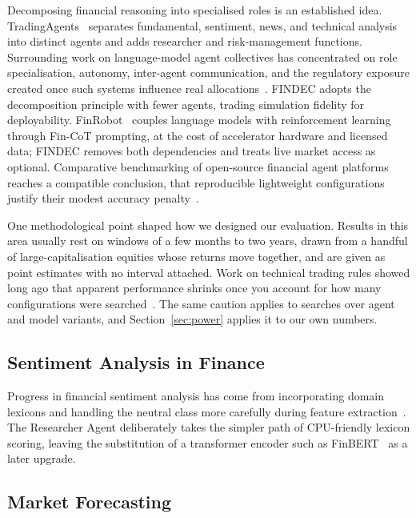 \documentclass[conference]{IEEEtran}
\begin{document}
Decomposing financial reasoning into specialised roles is an established idea. TradingAgents~\cite{xiao2024tradingagents} separates fundamental, sentiment, news, and technical analysis into distinct agents and adds researcher and risk-management functions. Surrounding work on language-model agent collectives has concentrated on role specialisation, autonomy, inter-agent communication, and the regulatory exposure created once such systems influence real allocations~\cite{lee2025large, liu2026large}. FINDEC adopts the decomposition principle with fewer agents, trading simulation fidelity for deployability. FinRobot~\cite{yang2024finrobot} couples language models with reinforcement learning through Fin-CoT prompting, at the cost of accelerator hardware and licensed data; FINDEC removes both dependencies and treats live market access as optional. Comparative benchmarking of open-source financial agent platforms reaches a compatible conclusion, that reproducible lightweight configurations justify their modest accuracy penalty~\cite{zhang2026finworld}.

One methodological point shaped how we designed our evaluation. Results in this area usually rest on windows of a few months to two years, drawn from a handful of large-capitalisation equities whose returns move together, and are given as point estimates with no interval attached. Work on technical trading rules showed long ago that apparent performance shrinks once you account for how many configurations were searched~\cite{sullivan1999data}. The same caution applies to searches over agent and model variants, and Section~\ref{sec:power} applies it to our own numbers.

\subsection{Sentiment Analysis in Finance}

Progress in financial sentiment analysis has come from incorporating domain lexicons and handling the neutral class more carefully during feature extraction~\cite{sun2025financial}. The Researcher Agent deliberately takes the simpler path of CPU-friendly lexicon scoring, leaving the substitution of a transformer encoder such as FinBERT~\cite{araci2019finbert} as a later upgrade.

\subsection{Market Forecasting}
\end{document}
